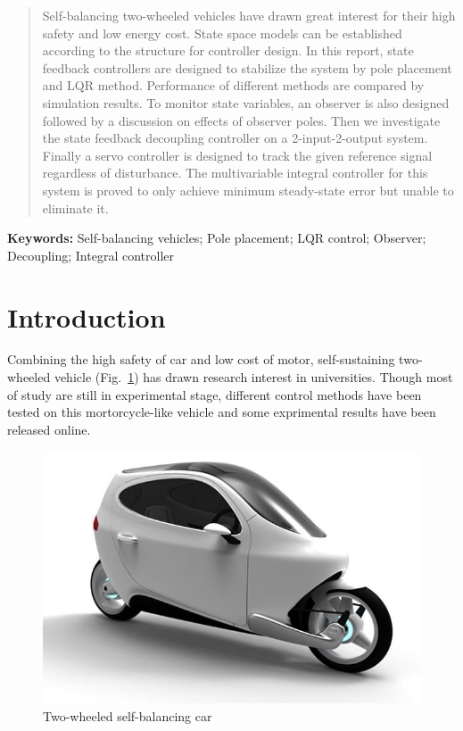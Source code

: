 \documentclass[hyperref]{article}
\theoremstyle{nonumberplain}
\begin{document}
	\begin{abstract}

	Self-balancing two-wheeled vehicles have drawn great interest for their high safety and low energy cost. State space models can be established according to the structure for controller design. In this report, state feedback controllers are designed to stabilize the system by pole placement and LQR method. Performance of different methods are compared by simulation results. To monitor state variables, an observer is also designed followed by a discussion on effects of observer poles. Then we investigate the state feedback decoupling controller on a 2-input-2-output system. Finally a servo controller is designed to track the given reference signal regardless of disturbance. The multivariable integral controller for this system is proved to only achieve minimum steady-state error but unable to eliminate it.
	
	
	\end{abstract}
	
	\vspace{1ex}
	{\noindent\small{\bf Keywords:}
		Self-balancing vehicles; Pole placement; LQR control; Observer; Decoupling; Integral controller}
	
	\newpage
	
	\tableofcontents
	\newpage
	
	\section{Introduction}
	
	\hspace{1.0em}
	Combining the high safety of car and low cost of motor, self-sustaining two-wheeled vehicle (Fig.~\ref{fig1}) has drawn research interest in universities. Though most of study are still in experimental stage, different control methods have been tested on this mortorcycle-like vehicle and some exprimental results have been released online. 
	
	\begin{figure}[htbp]
		\centering
		\includegraphics[width=0.4\linewidth]{fig1.png}
		\caption{Two-wheeled self-balancing car}
		\label{fig1}
	\end{figure} 
	
\end{document}
